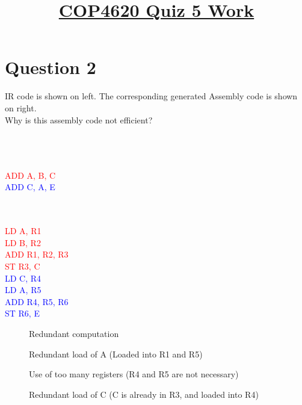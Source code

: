 \documentclass{article}
\title{\vspace{-50pt}\textbf{\underline{COP4620 Quiz 5 Work}}}
\author{}
\date{}
\newcommand{\cmark}{\ding{51}}%
\newcommand{\xmark}{\ding{55}}%
\newcommand{\textb}[1]{\textcolor{blue}{#1}}
\newcommand{\textr}[1]{\textcolor{red}{#1}}
\begin{document}
\maketitle
\vspace{-60pt}


\section*{Question 2}
IR code is shown on left.  The corresponding generated Assembly code is shown on right. \\
Why is this assembly code not efficient?
\vspace{-1em}
\begin{multicols}{3}
 \ \\ \ \\ \ \\
\textr{ADD A, B, C} \\
\textb{ADD C, A, E}
\vfill\columnbreak
 \ \\ \ \\ \ \\
\vfill\columnbreak
\textr{LD A, R1} \\
\textr{LD B, R2} \\
\textr{ADD R1, R2, R3} \\
\textr{ST R3, C} \\
\textb{LD C, R4} \\
\textb{LD A, R5} \\
\textb{ADD R4, R5, R6} \\
\textb{ST R6, E}
\end{multicols}
\begin{description}
  \item [\xmark] Redundant computation
  \item [\cmark] Redundant load of A \hspace{3.5em} (Loaded into R1 and R5)
  \item [\cmark] Use of too many registers \hspace{1.5em} (R4 and R5 are not necessary)
  \item [\cmark] Redundant load of C \hspace{3.5em} (C is already in R3, and loaded into R4) 
\end{description}
\end{document}

